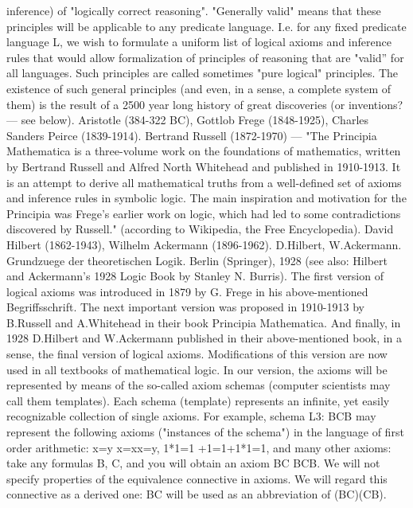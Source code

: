 inference) of "logically correct reasoning". "Generally valid" means that these principles will be
applicable to any predicate language. I.e. for any fixed predicate language L, we wish to formulate a
uniform list of logical axioms and inference rules that would allow formalization of principles of
reasoning that are "valid'' for all languages. Such principles are called sometimes "pure logical"
principles. The existence of such general principles (and even, in a sense, a complete system of them) is
the result of a 2500 year long history of great discoveries (or inventions? --- see below).
Aristotle (384-322 BC), Gottlob Frege (1848-1925), Charles Sanders Peirce (1839-1914).
Bertrand Russell (1872-1970) --- "The Principia Mathematica is a three-volume work on the foundations of mathematics,
written by Bertrand Russell and Alfred North Whitehead and published in 1910-1913. It is an attempt to derive all
mathematical truths from a well-defined set of axioms and inference rules in symbolic logic. The main inspiration and
motivation for the Principia was Frege's earlier work on logic, which had led to some contradictions discovered by Russell."
(according to Wikipedia, the Free Encyclopedia).
David Hilbert (1862-1943), Wilhelm Ackermann (1896-1962).
D.Hilbert, W.Ackermann. Grundzuege der theoretischen Logik. Berlin (Springer), 1928 (see also: Hilbert and Ackermann's
1928 Logic Book by Stanley N. Burris).
The first version of logical axioms was introduced in 1879 by G. Frege in his above-mentioned
Begriffsschrift. The next important version was proposed in 1910-1913 by B.Russell and A.Whitehead in
their book Principia Mathematica. And finally, in 1928 D.Hilbert and W.Ackermann published in their
above-mentioned book, in a sense, the final version of logical axioms. Modifications of this version are
now used in all textbooks of mathematical logic.
In our version, the axioms will be represented by means of the so-called axiom schemas (computer
scientists may call them templates). Each schema (template) represents an infinite, yet easily recognizable
collection of single axioms. For example, schema L3: B\AND C\IMPLIES B may represent the following axioms
("instances of the schema") in the language of first order arithmetic:
x=y \AND  x=x\IMPLIES x=y,
1*1=1 +1=1+1*1=1,
and many other axioms: take any formulas B, C, and you will obtain an axiom B\AND C B\AND C\IMPLIES B.
We will not specify properties of the equivalence connective in axioms. We will regard this connective as
a derived one: B\IFF C will be used as an abbreviation of (B\IMPLIES C)\AND (C\IMPLIES B).
